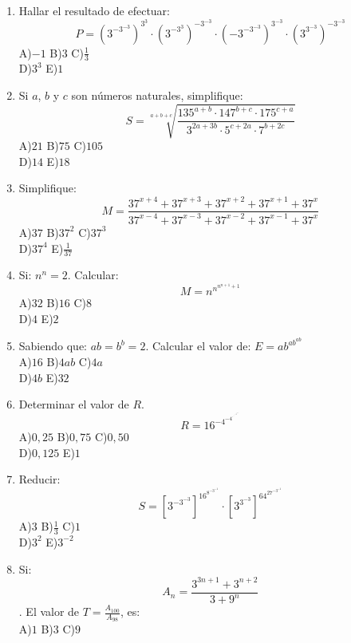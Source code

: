 \documentclass[
  10pt,
]{article}
\begin{document}
\begin{enumerate}
  D)\(8\) E)\(\sqrt{2}\)
\item
  Hallar el resultado de efectuar:\\
  \[P = \left( 3^{- 3^{- 3}} \right)^{3^{3}} \cdot \left( 3^{- 3^{3}} \right)^{- 3^{- 3}} \cdot \left( - 3^{- 3^{- 3}} \right)^{3^{- 3}} \cdot \left( 3^{3^{- 3}} \right)^{- 3^{- 3}}
  \]A)\(- 1\) B)\(3\) C)\(\frac{1}{3}\)\\
  D)\(3^{3}\) E)\(1\)
\item
  Si \(a\), \(b\) y \(c\) son números naturales, simplifique:\\
  \[S = \sqrt[{a + b + c}]{\frac{135^{a + b} \cdot 147^{b + c} \cdot 175^{c + a}}{3^{2a + 3b} \cdot 5^{c + 2a} \cdot 7^{b + 2c}}}
  \]A)\(21\) B)\(75\) C)\(105\)\\
  D)\(14\) E)\(18\)
\item
  Simplifique:\\
  \[M = \frac{37^{x + 4} + 37^{x + 3} + 37^{x + 2} + 37^{x + 1} + 37^{x}}{37^{x - 4} + 37^{x - 3} + 37^{x - 2} + 37^{x - 1} + 37^{x}}
  \]A)\(37\) B)\(37^{2}\) C)\(37^{3}\)\\
  D)\(37^{4}\) E)\(\frac{1}{37}\)
\item
  Si: \(n^{n} = 2\). Calcular:\\
  \[M = n^{n^{n^{n + 1} + 1}}
  \]A)\(32\) B)\(16\) C)\(8\)\\
  D)\(4\) E)\(2\)
\item
  Sabiendo que: \(ab = b^{b} = 2\). Calcular el valor de:
  \(E = ab^{ab^{ab}}\)\\
  A)\(16\) B)\(4ab\) C)\(4a\)\\
  D)\(4b\) E)\(32\)
\item
  Determinar el valor de \(R\).\\
  \[R = 16^{- 4^{- 4^{\cdot^{\cdot^{\cdot^{- 4^{- 2^{- 1}}}}}}}}
  \]A)\(0,25\) B)\(0,75\) C)\(0,50\)\\
  D)\(0,125\) E)\(1\)
\item
  Reducir:\\
  \[S = \left\lbrack 3^{- 3^{- 3}} \right\rbrack^{16^{8^{- 3^{- 1}}}} \cdot \left\lbrack 3^{3^{- 3}} \right\rbrack^{64^{27^{- 3^{- 1}}}}
  \]A)\(3\) B)\(\frac{1}{3}\) C)\(1\)\\
  D)\(3^{2}\) E)\(3^{- 2}\)
\item
  Si:\\
  \[A_{n} = \frac{3^{3n + 1} + 3^{n + 2}}{3 + 9^{n}}
  \]. El valor de \(T = \frac{A_{100}}{A_{98}}\), es:\\
  A)\(1\) B)\(3\) C)\(9\)\\

\end{enumerate}
\end{document}
